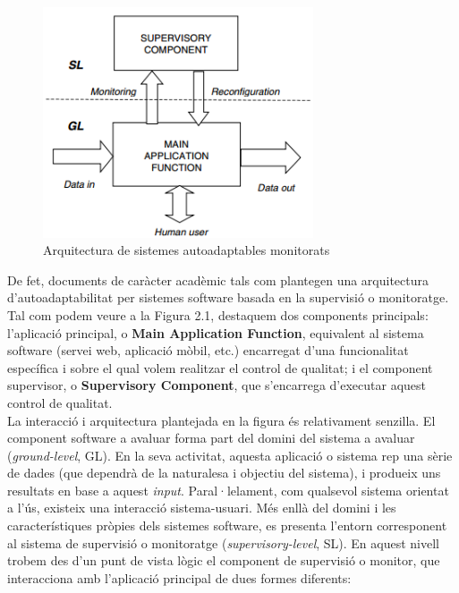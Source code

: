 \begin{figure}
\centering
\includegraphics[width=8cm]{Figures/Figure1}
\decoRule
\caption[Arquitectura de sistemes auotadaptables monitorats]{Arquitectura de sistemes autoadaptables monitorats}
\label{fig:Figura1}
\end{figure}

De fet, documents de caràcter acadèmic tals com \cite{nashville} plantegen una arquitectura d’autoadaptabilitat per sistemes software basada en la supervisió o monitoratge. Tal com podem veure a la Figura 2.1, destaquem dos components principals: l’aplicació principal, o \textbf{Main Application Function}, equivalent al sistema software (servei web, aplicació mòbil, etc.) encarregat d'una funcionalitat específica i sobre el qual volem realitzar el control de qualitat; i el component supervisor, o \textbf{Supervisory Component}, que s'encarrega d'executar aquest control de qualitat.\\

La interacció i arquitectura plantejada en la figura és relativament senzilla. El component software a avaluar forma part del domini del sistema a avaluar (\textit{ground-level}, GL). En la seva activitat, aquesta aplicació o sistema rep una sèrie de dades (que dependrà de la naturalesa i objectiu del sistema), i produeix uns resultats en base a aquest \textit{input}. Paral·lelament, com qualsevol sistema orientat a l'ús, existeix una interacció sistema-usuari. Més enllà del domini i les característiques pròpies dels sistemes software, es presenta l'entorn corresponent al sistema de supervisió o monitoratge (\textit{supervisory-level}, SL). En aquest nivell trobem des d'un punt de vista lògic el component de supervisió o monitor, que interacciona amb l'aplicació principal de dues formes diferents:

